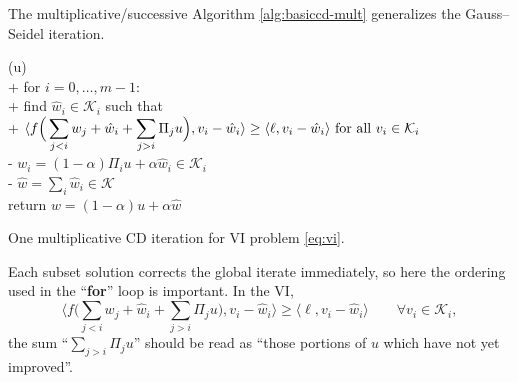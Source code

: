 \documentclass[letterpaper,final,12pt,reqno]{amsart}
\theoremstyle{cstyle}
\theoremstyle{cstyle*}
\theoremstyle{dstyle}
\numberwithin{equation}{section}
\numberwithin{figure}{section}
\numberwithin{table}{section}
\numberwithin{theorem}{section}
\newcommand{\cK}{\mathcal{K}}
\newcommand{\cV}{\mathcal{V}}
\newcommand{\ip}[2]{\langle#1,#2\rangle}
\begin{document}
The multiplicative/successive  Algorithm \ref{alg:basiccd-mult} generalizes the Gauss--Seidel iteration.  \begin{pseudofloat}[H]
\begin{pseudo*}
(u)\text{:} \\+
    for $i = 0,\dots,m-1$: \\+
        \rm{find} $\hat w_i\in \cK_i$ \rm{such that} \\+
            $\displaystyle \ip{f\Big(\sum_{j<i} w_j + \hat w_i + \sum_{j>i} \Pi_j u\Big)}{v_i-\hat w_i} \ge \ip{\ell}{v_i-\hat w_i} \textnormal{ for all } v_i \in \cK_i$ \\-
            $w_i = (1-\alpha) \Pi_i u + \alpha \hat w_i\in\cK_i$ \\-
    $\hat w = \sum_i \hat w_i\in\cK$ \\
    return $w=(1-\alpha) u + \alpha \hat w$
\end{pseudo*}
\caption{One multiplicative CD iteration for VI problem \eqref{eq:vi}.}
\label{alg:basiccd-mult}
\end{pseudofloat}
Each subset solution corrects the global iterate immediately, so here the ordering used in the ``\textbf{for}'' loop is important.  In the VI,
\begin{equation}
\ip{f\Big(\sum_{j<i} w_j + \hat w_i + \sum_{j>i} \Pi_j u\Big)}{v_i-\hat w_i} \ge \ip{\ell}{v_i-\hat w_i} \qquad \forall v_i \in \mathcal{K}_i, \label{eq:cdmultvi}
\end{equation}
the sum ``$\sum_{j>i} \Pi_j u$'' should be read as ``those portions of $u$ which have not yet improved''.



\end{document}
